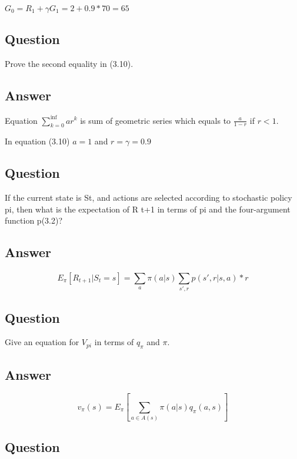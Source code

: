 \documentclass[11pt]{article}
\begin{document}
    $G_0 = R_{1} + \gamma G_{1} = 2 + 0.9 * 70 = 65 $

    \subsection{Question}

    Prove the second equality in (3.10).

    \subsection*{Answer}

    Equation $\sum_{k=0}^{\inf}ar^k$ is sum of geometric series which equals to $\frac{a}{1-r}$ if $r<1$.

    In equation (3.10) $a=1$ and $r = \gamma = 0.9$

    \subsection{Question}

    If the current state is St, and actions are selected according to stochastic policy pi, then what is the expectation of R t+1 in terms of pi and the four-argument function p(3.2)?

    \subsection*{Answer}

    \begin{equation}
        E_{\pi}[R_{t+1}|S_{t}=s] = \sum_{a}^{} \pi(a|s) \sum_{s', r}^{} p(s',r|s, a) * r
    \end{equation}

    \subsection{Question}

    Give an equation for $V_{pi}$ in terms of $q_\pi$ and $\pi$.

    \subsection*{Answer}

    \begin{equation}
        v_{\pi}(s) = E_{\pi}[\sum_{a \in A(s)}^{} \pi(a|s)q_{\pi}(a,s)]
    \end{equation}

    \subsection{Question}
\end{document}
